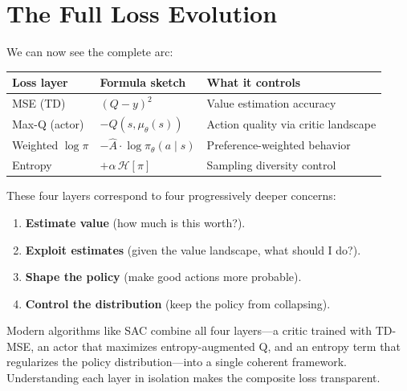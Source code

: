 \section{The Full Loss Evolution}
\label{sec:loss-evolution}

We can now see the complete arc:

\begin{center}
\begin{tabular}{@{} l l l @{}}
\toprule
\textbf{Loss layer} & \textbf{Formula sketch} & \textbf{What it controls} \\
\midrule
MSE (TD) & $(Q - y)^2$ & Value estimation accuracy \\
Max-Q (actor) & $-Q(s, \mu_\theta(s))$ & Action quality via critic landscape \\
Weighted $\log\pi$ & $-\hat{A}\cdot\log\pi_\theta(a \mid s)$ & Preference-weighted behavior \\
Entropy & $+\alpha\,\mathcal{H}[\pi]$ & Sampling diversity control \\
\bottomrule
\end{tabular}
\end{center}

These four layers correspond to four progressively deeper concerns:
\begin{enumerate}
  \item \textbf{Estimate value} (how much is this worth?).
  \item \textbf{Exploit estimates} (given the value landscape, what should I do?).
  \item \textbf{Shape the policy} (make good actions more probable).
  \item \textbf{Control the distribution} (keep the policy from collapsing).
\end{enumerate}

Modern algorithms like SAC combine all four layers---a critic trained with TD-MSE, an actor that maximizes entropy-augmented Q, and an entropy term that regularizes the policy distribution---into a single coherent framework. Understanding each layer in isolation makes the composite loss transparent.
